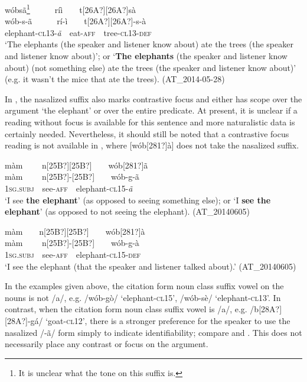 \documentclass[output=paper]{langsci/langscibook}
\begin{document}
\ea\label{ex:teo:45}
\label{bkm:Ref432764274}
w\'{o}bs\~{a}\footnote{It is unclear what the tone on this suffix is.}\ \ \ \ \ \ ríì\ \ \ \ t[26A?][26A?]sà\\
\gll w\'{o}b\nobreakdash-s\nobreakdash-\~{a}\ \ \ \ \ \ rí\nobreakdash-ì\ \ \ \ t[26A?][26A?]\nobreakdash-s\nobreakdash-à\\
elephant\nobreakdash-\textsc{cl13\nobreakdash-}\textit{ã}\textsc{\ \ }eat\nobreakdash-\textsc{aff}\ \ tree\nobreakdash-\textsc{cl13\nobreakdash-def}\\
\glt ‘The elephants (the speaker and listener know about) ate the trees (the speaker and listener know about)’; or ‘\textbf{The elephants} (the speaker and listener know about) (not something else) ate the trees (the speaker and listener know about)’ (e.g. it wasn’t the mice that ate the trees). (AT\_2014-05-28)
\z

In , the nasalized suffix also marks contrastive focus and either has scope over the argument ‘the elephant’ or over the entire predicate. At present, it is unclear if a reading without focus is available for this sentence and more naturalistic data is certainly needed. Nevertheless, it should still be noted that a contrastive focus reading is not available in , where [w\'{o}b[281?]\`{a}] does not take the nasalized suffix.


\ea\label{ex:teo:46}
\label{bkm:Ref432764930}m\`{a}m \ \ \ \ n[25B?][25B?]\ \ \ \ w\'{o}b[281?]\~{a}\\
\gll m\`{a}m \ \ \ \ n[25B?]\nobreakdash-[25B?]\ \ \ \ w\'{o}b-g\nobreakdash-\~{a}\\
\textsc{1sg.subj}\ \ see-\textsc{aff}\ \ elephant-\textsc{cl15}{}-\textit{\~{a}}\\
\glt ‘I see \textbf{the elephant}’ (as opposed to seeing something else); or ‘I \textbf{see the elephant}’ (as opposed to not seeing the elephant). (AT\_20140605)
\z

\ea\label{ex:teo:47}
\label{bkm:Ref432765064}m\`{a}m\ \  \ \ n[25B?][25B?]\ \ \ \ w\'{o}b[281?]\`{a}\\
\gll m\`{a}m \ \ \ \ n[25B?]\nobreakdash-[25B?]\ \ \ \ w\'{o}b-g\nobreakdash-\`{a}\\
1\textsc{sg.subj}\ \ see-\textsc{aff}\ \ elephant-\textsc{cl15-def}\\
\glt ‘I see the elephant (that the speaker and listener talked about).’ (AT\_20140605)
\z

In the examples given above, the citation form noun class suffix vowel on the nouns is not /a/, e.g. /w\'{o}b-g\`{o}/ ‘elephant-\textsc{cl15}’, /w\'{o}b-s\`{e}/ ‘elephant-\textsc{cl13}’. In contrast, when the citation form noun class suffix vowel is /a/, e.g. /b[28A?][28A?]-gá/\textit{ }‘goat-\textsc{cl12}’, there is a stronger preference for the speaker to use the nasalized /-ã/ form simply to indicate identifiability; compare  and . This does not necessarily place any contrast or focus on the argument.
\end{document}

